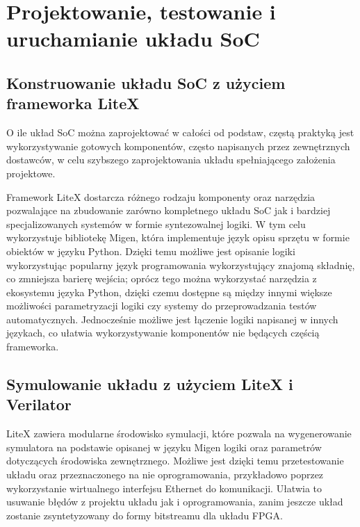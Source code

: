 \section{Projektowanie, testowanie i uruchamianie układu SoC}
\subsection{Konstruowanie układu SoC z użyciem frameworka LiteX}
O ile układ SoC można zaprojektować w całości od podstaw, częstą praktyką jest wykorzystywanie gotowych komponentów, często napisanych przez zewnętrznych dostawców, w celu szybszego zaprojektowania układu spełniającego założenia projektowe.

Framework LiteX\cite{https://doi.org/10.48550/arxiv.2005.02506} dostarcza różnego rodzaju komponenty oraz narzędzia pozwalające na zbudowanie zarówno kompletnego układu SoC jak i bardziej specjalizowanych systemów w formie syntezowalnej logiki. W tym celu wykorzystuje bibliotekę Migen, która implementuje język opisu sprzętu w formie obiektów w języku Python. Dzięki temu możliwe jest opisanie logiki wykorzystując popularny język programowania wykorzystujący znajomą składnię, co zmniejsza barierę wejścia; oprócz tego można wykorzystać narzędzia z ekosystemu języka Python, dzięki czemu dostępne są między innymi większe możliwości parametryzacji logiki czy systemy do przeprowadzania testów automatycznych. Jednocześnie możliwe jest łączenie logiki napisanej w innych językach, co ułatwia wykorzystywanie komponentów nie będących częścią frameworka.


\subsection{Symulowanie układu z użyciem LiteX i Verilator}
LiteX zawiera modularne środowisko symulacji, które pozwala na wygenerowanie symulatora na podstawie opisanej w języku Migen logiki oraz parametrów dotyczących środowiska zewnętrznego. Możliwe jest dzięki temu przetestowanie układu oraz przeznaczonego na nie oprogramowania, przykładowo poprzez wykorzystanie wirtualnego interfejsu Ethernet do komunikacji. Ułatwia to usuwanie błędów z projektu układu jak i oprogramowania, zanim jeszcze układ zostanie zsyntetyzowany do formy bitstreamu dla układu FPGA.



